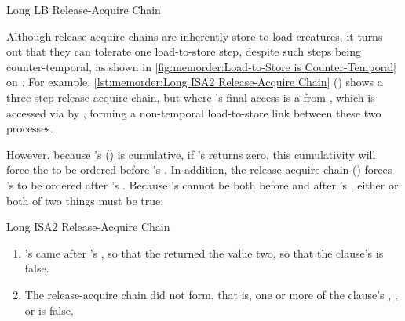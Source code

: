 \begin{listing}

\caption{Long LB Release-Acquire Chain}
\label{lst:memorder:Long LB Release-Acquire Chain}
\end{listing}

Although release-acquire chains are inherently store-to-load creatures,
it turns out that they can tolerate one load-to-store step, despite
such steps being counter-temporal, as shown in
\cref{fig:memorder:Load-to-Store is Counter-Temporal}
on
.
For example,
\cref{lst:memorder:Long ISA2 Release-Acquire Chain}
()
shows a three-step release-acquire chain, but where 's
final access is a  from , which is
accessed via  by , forming a non-temporal
load-to-store link between these two processes.
\begin{fcvref}
However, because 's  ()
is cumulative, if 's  returns zero,
this cumulativity will force the  to be ordered
before 's .
In addition, the release-acquire chain
()
forces 's  to be ordered after 's
.
Because 's  cannot be both before and after
's , either or both of two things must
be true:
\end{fcvref}

\begin{listing}

\caption{Long ISA2 Release-Acquire Chain}
\label{lst:memorder:Long ISA2 Release-Acquire Chain}
\end{listing}

\begin{enumerate}
\item	{}'s  came after 's
	, so that the  returned
	the value two, so that the  clause's 
	is false.
\item	The release-acquire chain did not form, that is, one or more
	of the  clause's , , or 
	is false.
\end{enumerate}

